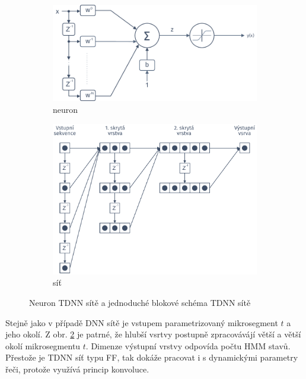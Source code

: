\begin{figure}[htpb]
  \centering
  \begin{subfigure}[b]{0.45\textwidth}
    \includegraphics[width=\textwidth]{./ch4-asr/img/neuron-tdnn.pdf}
    \caption{neuron}
    \label{fig:asr:acoustic:dnn:tdnn:neuron}
  \end{subfigure}
  \begin{subfigure}[b]{0.35\textwidth}
    \includegraphics[width=\textwidth]{./ch4-asr/img/tdnn.pdf}
    \caption{síť}
    \label{fig:asr:acoustic:dnn:tdnn:net}
  \end{subfigure}
  \caption{Neuron TDNN sítě a jednoduché blokové schéma TDNN sítě \cite{Craig2000}}
  \label{fig:asr:acoustic:dnn:tdnn}
\end{figure}

Stejně jako v případě DNN sítě je vstupem parametrizovaný mikrosegment $t$ a jeho okolí. Z obr. \ref{fig:asr:acoustic:dnn:tdnn:net} je patrné, že hlubší vsrtvy postupně zpracovávájí větší a větší okolí mikrosegmentu $t$. Dimenze výstupní vrstvy odpovída počtu HMM stavů. Přestože je TDNN síť typu FF, tak dokáže pracovat i s dynamickými parametry řeči, protože využívá princip konvoluce.
